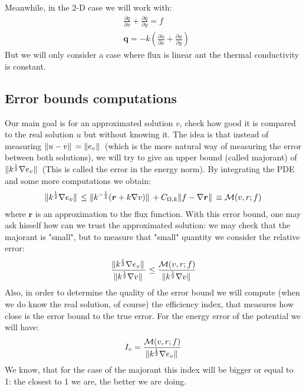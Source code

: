 \documentclass{article}
\begin{document}
    Meanwhile, in the 2-D case we will work with:
    \begin{align*}
        &\frac{\partial q}{\partial x} + \frac{\partial q}{\partial y}  = f \\
        &\bm{q} = -k \left( \frac{\partial u}{\partial x} + \frac{\partial u}{\partial y}\right)
    \end{align*}
    But we will only consider a case where flux is linear ant the thermal conductivity is constant.
    
    \subsection*{Error bounds computations}
    Our main goal is for an approximated solution $v$, check how good it is compared to the real solution $u$ but without knowing it. The idea is that instead of measuring $\norm*{u-v} = \norm*{e_v}$ (which is the more natural way of measuring the error between both solutions), we will try to give an upper bound (called majorant) of $\norm*{k^{\frac{1}{2}}\nabla e_v}$ (This is called the error in the energy norm). By integrating the PDE and some more computations we obtain:
    \begin{align*}
        \norm*{k^{\frac{1}{2}}\nabla e_v} \leq \norm*{k^{-\frac{1}{2}}(\bm{r}+k\nabla v)} + C_{\Omega,k}\norm*{f-\nabla \bm{r}} \equiv \mathcal{M}(v,r;f)
    \end{align*}
    where $\bm{r}$ is an approximation to the flux function.
    With this error bound, one may ask hisself how can we trust the approximated solution: we may check that the majorant is "small", but to measure that "small" quantity we consider the relative error:
    \begin{align*}
        \frac{\norm*{k^{\frac{1}{2}}\nabla e_v}}{\norm*{k^{\frac{1}{2}}\nabla v}} \leq \frac{\mathcal{M}(v,r;f)}{\norm*{k^{\frac{1}{2}}\nabla v}}
    \end{align*}
    Also, in order to determine the quality of the error bound we will compute (when we do know the real solution, of course) the efficiency index, that measures how close is the error bound to the true error. For the energy error of the potential we will have:
    \begin{align*}
        I_v = \frac{\mathcal{M}(v,r;f)}{\norm*{k^{\frac{1}{2}}\nabla e_v}}
    \end{align*}
    We know, that for the case of the majorant this index will be bigger or equal to 1: the closest to 1 we are, the better we are doing.\\
\end{document}
